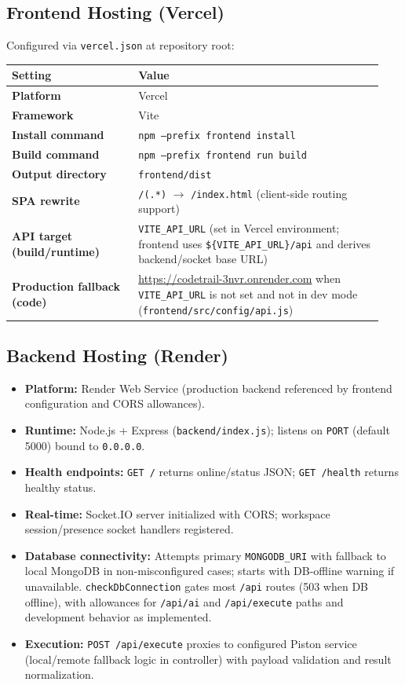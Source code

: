 ﻿\documentclass[11pt,a4paper]{article}
\begin{document}
\vspace{0.4em}
\subsection{Frontend Hosting (Vercel)}
Configured via \texttt{vercel.json} at repository root:
\begin{longtable}{@{}>{\bfseries}p{0.32\linewidth}p{0.62\linewidth}@{}}
\toprule
Setting & Value \\
\midrule
Platform & Vercel \\
Framework & Vite \\
Install command & \texttt{npm --prefix frontend install} \\
Build command & \texttt{npm --prefix frontend run build} \\
Output directory & \texttt{frontend/dist} \\
SPA rewrite & \texttt{/(.*)} $\rightarrow$ \texttt{/index.html} (client-side routing support) \\
API target (build/runtime) & \texttt{VITE\_API\_URL} (set in Vercel environment; frontend uses \texttt{\$\{VITE\_API\_URL\}/api} and derives backend/socket base URL) \\
Production fallback (code) & \url{https://codetrail-3nvr.onrender.com} when \texttt{VITE\_API\_URL} is not set and not in dev mode (\texttt{frontend/src/config/api.js}) \\
\bottomrule
\end{longtable}

\vspace{0.6em}
\subsection{Backend Hosting (Render)}
\begin{itemize}[leftmargin=*]
  \item \textbf{Platform:} Render Web Service (production backend referenced by frontend configuration and CORS allowances).
  \item \textbf{Runtime:} Node.js + Express (\texttt{backend/index.js}); listens on \texttt{PORT} (default 5000) bound to \texttt{0.0.0.0}.
  \item \textbf{Health endpoints:} \texttt{GET /} returns online/status JSON; \texttt{GET /health} returns healthy status.
  \item \textbf{Real-time:} Socket.IO server initialized with CORS; workspace session/presence socket handlers registered.
  \item \textbf{Database connectivity:} Attempts primary \texttt{MONGODB\_URI} with fallback to local MongoDB in non-misconfigured cases; starts with DB-offline warning if unavailable. \texttt{checkDbConnection} gates most \texttt{/api} routes (503 when DB offline), with allowances for \texttt{/api/ai} and \texttt{/api/execute} paths and development behavior as implemented.
  \item \textbf{Execution:} \texttt{POST /api/execute} proxies to configured Piston service (local/remote fallback logic in controller) with payload validation and result normalization.
\end{itemize}
\end{document}
